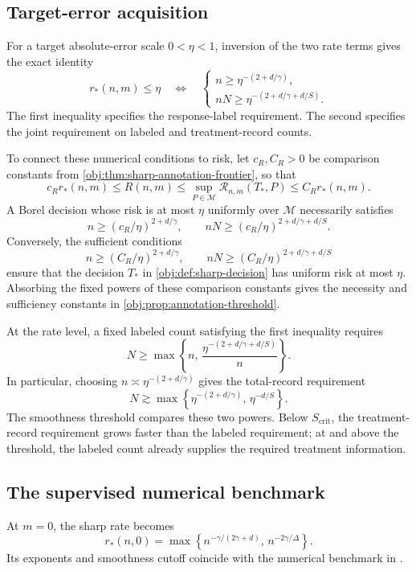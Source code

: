 \documentclass[11pt]{article}
\begin{document}
\subsection{Target-error acquisition}

For a target absolute-error scale \(0<\eta<1\), inversion of the two rate terms gives the exact identity
\[
r_*(n,m)\le\eta
\quad\Longleftrightarrow\quad
\begin{cases}
n\ge \eta^{-(2+d/\gamma)},\\
nN\ge \eta^{-(2+d/\gamma+d/S)}.
\end{cases}
\]
The first inequality specifies the response-label requirement. The second specifies the joint requirement on labeled and treatment-record counts.

To connect these numerical conditions to risk, let \(c_R,C_R>0\) be comparison constants from \cref{obj:thm:sharp-annotation-frontier}, so that
\[
c_Rr_*(n,m)
\le R(n,m)
\le \sup_{P\in\mathcal M}\mathcal R_{n,m}(T_*,P)
\le C_Rr_*(n,m).
\]
A Borel decision whose risk is at most \(\eta\) uniformly over \(\mathcal M\) necessarily satisfies
\[
n\ge (c_R/\eta)^{2+d/\gamma},
\qquad
nN\ge (c_R/\eta)^{2+d/\gamma+d/S}.
\]
Conversely, the sufficient conditions
\[
n\ge (C_R/\eta)^{2+d/\gamma},
\qquad
nN\ge (C_R/\eta)^{2+d/\gamma+d/S}
\]
ensure that the decision \(T_*\) in \cref{obj:def:sharp-decision} has uniform risk at most \(\eta\). Absorbing the fixed powers of these comparison constants gives the necessity and sufficiency constants in \cref{obj:prop:annotation-threshold}.

At the rate level, a fixed labeled count satisfying the first inequality requires
\[
N\ge
\max\left\{
n,\,
\frac{\eta^{-(2+d/\gamma+d/S)}}{n}
\right\}.
\]
In particular, choosing \(n\asymp\eta^{-(2+d/\gamma)}\) gives the total-record requirement
\[
N\gtrsim
\max\left\{
\eta^{-(2+d/\gamma)},\,
\eta^{-d/S}
\right\}.
\]
The smoothness threshold compares these two powers. Below \(S_{\mathrm{crit}}\), the treatment-record requirement grows faster than the labeled requirement; at and above the threshold, the labeled count already supplies the required treatment information.

\subsection{The supervised numerical benchmark}

At \(m=0\), the sharp rate becomes
\[
r_*(n,0)
=
\max\left\{
n^{-\gamma/(2\gamma+d)},\,
n^{-2\gamma/\Delta}
\right\}.
\]
Its exponents and smoothness cutoff coincide with the numerical benchmark in \citet[Section 3, Theorem 1]{KennedyBalakrishnanRobinsWasserman2024}.
\end{document}
